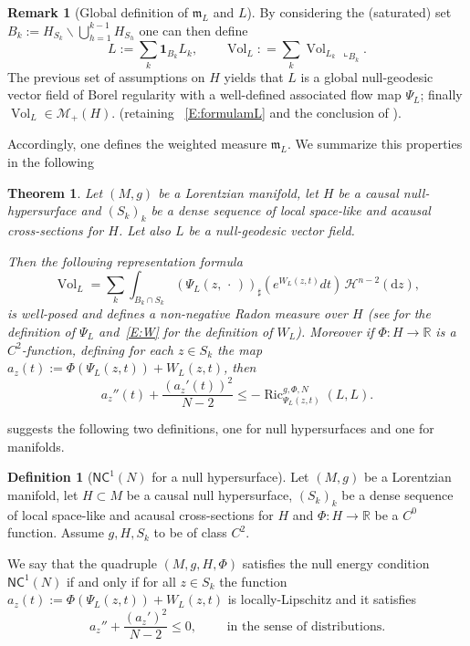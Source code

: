 \documentclass[12pt,a4paper]{amsart}
\theoremstyle{plain}
\newtheorem{theorem}[lemma]{Theorem}
\theoremstyle{definition}
\newtheorem{definition}[lemma]{Definition}
\newtheorem{remark}[lemma]{Remark}
\numberwithin{equation}{section}
\newcommand{\R}{\mathbb{R}}
\DeclareMathOperator{\Ric}{Ric}
\DeclareMathOperator{\vol}{Vol}
\newcommand{\de}{{\mathrm{d}}}
\newcommand{\NC}{\mathsf{NC}}
\newcommand{\dotargument}{\,\cdot\,}
\newcommand{\gflow}{\Psi}
\newcommand{\indicator}{\mathbf{1}}
\newcommand{\mm}{\mathfrak m}
\begin{document}
\begin{remark}[Global definition of $\mm_{L}$ and $L$]
By considering the (saturated) set
$B_k:=H_{S_k}\backslash \bigcup_{h=1}^{k-1} H_{S_h}$ 
one can then define
%
\begin{equation}\label{E:globalL}
 L:= \sum_{k}  \indicator_{B_k} L_k,
\qquad \vol_{L} : = \sum_k \vol_{L_k}\llcorner_{B_{k}}.
\end{equation}
%
The previous set of assumptions on $H$ yields that $L$ is a global null-geodesic vector field of Borel  regularity 
with a well-defined associated flow map $\gflow_L$;
finally $\vol_{L} \in \mathcal{M}_{+}(H)$.
(retaining 
~\eqref{E:formulamL} and the conclusion of ).

Accordingly, one defines  the weighted measure 
$\mm_{L}$. 
%
%
We summarize this properties in the following 
\end{remark}


\begin{theorem}\label{T:summary}
  Let $(M,g)$ be a Lorentzian manifold, let $H$ be a causal null-hypersurface and $(S_k)_k$
be a dense sequence of local space-like and acausal cross-sections   
for $H$.
%
Let also $L$ be a null-geodesic vector field.

Then the following representation formula
%
$$
\vol_L = \sum_k \int_{B_k \cap S_k} (\Psi_L(z,\dotargument))_\sharp 
\left( e^{W_L(z,t)} dt \right) \, \mathcal{H}^{n-2}(\de z),
$$
%
is well-posed and defines a non-negative Radon measure over $H$ (see  for the definition of $\gflow_L$ and~\eqref{E:W} for the definition of $W_L$). 
Moreover if $\Phi: H \to \R$ is a $C^2$-function, 
defining for each $z\in S_k$
 the map $a_z(t):=\Phi(\gflow_L(z,t))+W_{L}(z,t)$,  then
$$ 
    a_z''(t)
    +\frac{(a_z'(t))^2}{N-2}
    \leq
    -\Ric^{g,\Phi,N}_{\gflow_{L}(z,t)}(L,L)
    .
$$
\end{theorem}












 suggests 
the following two definitions, one for
null hypersurfaces and one for manifolds.

\begin{definition}[$\NC^{1}(N)$ for a null hypersurface]\label{def:NC1Quadruples}
  Let $(M,g)$ be a Lorentzian manifold, 
   let $H\subset M$ be a causal null hypersurface, 
    $(S_k)_k$ be a dense sequence of local space-like and acausal cross-sections for $H$
  and $\Phi:H \to\R$ be a $C^0$ function. Assume $g, H, S_k$ to be of class $C^2$.
  
We say that the quadruple $(M,g,H, \Phi)$ satisfies the null energy condition
  $\NC^1(N)$ if and only if for all $z\in S_{k}$ the function
$a_z(t):=\Phi(\gflow_L(z,t)) + W_{L}(z,t)$ is locally-Lipschitz and it  satisfies
\begin{equation}
  a_z''
  +
  \frac{(a_z')^2}{N-2}
  \leq 0
  ,
  \qquad
  \text{ in the sense of distributions}.
\end{equation}
\end{definition}
\end{document}
